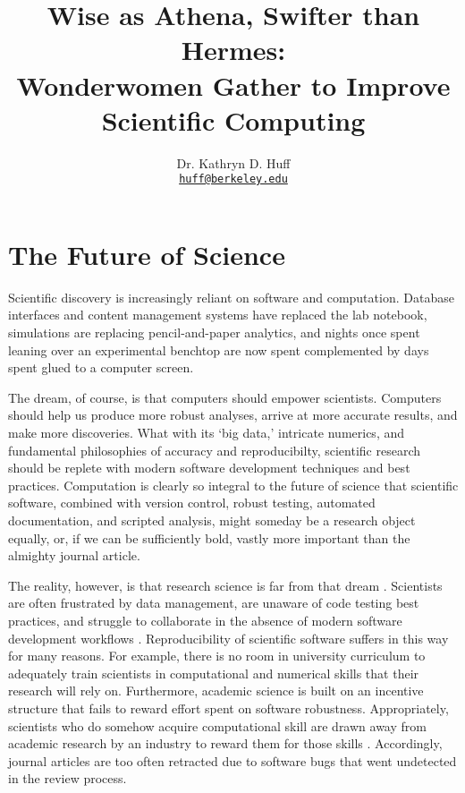 \documentclass[letterpaper]{article}
\author{Dr. Kathryn D. Huff
  \\ \href{mailto:huff@berkeley.edu}{\texttt{huff@berkeley.edu}}
}
\date{}
\title{Wise as Athena, Swifter than Hermes:\\
Wonderwomen Gather to Improve Scientific Computing}
\begin{document}
\maketitle

\section*{The Future of Science}

Scientific discovery is increasingly reliant on 
software and computation. Database interfaces and content 
management systems have replaced the lab notebook, simulations are replacing 
pencil-and-paper analytics, and nights once spent leaning over an experimental 
benchtop are now spent complemented by days spent glued to a computer screen.  

The dream, of course, is that computers should empower scientists. Computers 
should help us produce more robust analyses, arrive at more accurate results, 
and make more discoveries. What with its `big data,' intricate numerics, and 
fundamental philosophies of accuracy and reproducibilty,  scientific research 
should be replete with modern software development techniques and best 
practices.  Computation is clearly so integral to the future of science that 
scientific software, combined with version control, robust testing, automated 
documentation, and scripted analysis, might someday be a research object 
equally, or, if we can be sufficiently bold, vastly more important than the 
almighty journal article.

The reality, however, is that research science is far from that dream 
\cite{hatton_t_1997,merali_computational_2010,joppa_troubling_2013} .  
Scientists are often frustrated by data management, are unaware of code testing 
best practices, and struggle to collaborate in the absence of modern software 
development workflows 
\cite{ackroyd_scientific_2008,segal_when_2005,hannay_how_2009,dubois_why_2003}.  
Reproducibility of scientific software suffers in this way for many reasons. For 
example, there is no room in university curriculum to adequately train 
scientists in computational and numerical skills that their research will rely 
on. Furthermore, academic science is built on an incentive structure that fails 
to reward effort spent on software robustness. Appropriately, scientists who do 
somehow acquire computational skill are drawn away from academic research by an 
industry to reward them for those skills \cite{vanderplas_big_2013}.  
Accordingly, journal articles are too often retracted due to software bugs that 
went undetected in the review process.
\end{document}
